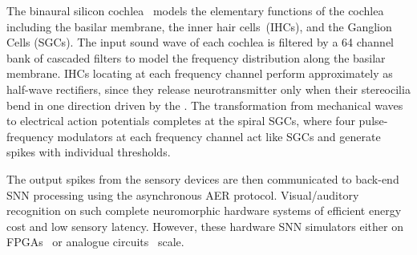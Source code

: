 The binaural silicon cochlea~\citep{5537164} models the elementary functions of the cochlea including the basilar membrane, the inner hair cells~(IHCs), and the \DIFdelbegin {}\DIFdelend \DIFaddbegin {}\DIFaddend Ganglion Cells (SGCs).
The input sound wave of each cochlea is filtered by a 64 channel bank of cascaded filters to model the frequency distribution along the basilar membrane.
IHCs locating at each frequency channel perform approximately as half-wave rectifiers, since they release neurotransmitter only when their stereocilia bend in one direction driven by the \DIFdelbegin {}\DIFdelend \DIFaddbegin {}\DIFaddend .
The transformation from mechanical waves to electrical action potentials completes at the spiral SGCs, where four pulse-frequency modulators at each frequency channel act like SGCs and generate spikes with individual thresholds.


The output spikes from the sensory devices are then communicated to back-end SNN processing using the asynchronous AER protocol.
Visual/auditory recognition on such complete neuromorphic hardware systems \DIFdelbegin {}\DIFdelend \DIFaddbegin {}\DIFaddend of efficient energy cost and low sensory latency.
However, these hardware SNN simulators either \DIFdelbegin {}\DIFdelend \DIFaddbegin {}\DIFaddend on FPGAs~\citep{neil2014minitaur, kiselev2016event} or analogue circuits~\citep{qiao2015reconfigurable} \DIFdelbegin {}\DIFdelend \DIFaddbegin {}\DIFaddend scale.

